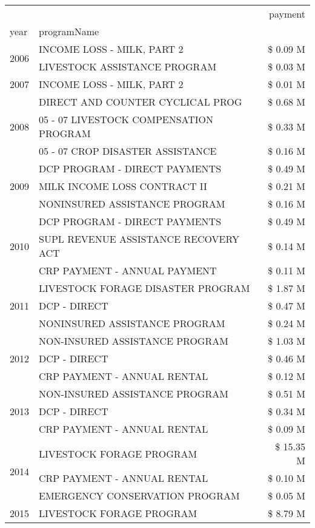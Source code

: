 \begin{tabular}{llr}
\toprule
 &  & payment \\
year & programName &  \\
\midrule
\multirow[t]{2}{*}{2006} & INCOME LOSS - MILK, PART 2 & \$ 0.09 M \\
 & LIVESTOCK ASSISTANCE PROGRAM & \$ 0.03 M \\
\cline{1-3}
2007 & INCOME LOSS - MILK, PART 2 & \$ 0.01 M \\
\cline{1-3}
\multirow[t]{3}{*}{2008} & DIRECT AND COUNTER CYCLICAL PROG & \$ 0.68 M \\
 & 05 - 07 LIVESTOCK COMPENSATION PROGRAM & \$ 0.33 M \\
 & 05 - 07 CROP DISASTER ASSISTANCE & \$ 0.16 M \\
\cline{1-3}
\multirow[t]{3}{*}{2009} & DCP PROGRAM - DIRECT PAYMENTS & \$ 0.49 M \\
 & MILK INCOME LOSS CONTRACT II & \$ 0.21 M \\
 & NONINSURED ASSISTANCE PROGRAM & \$ 0.16 M \\
\cline{1-3}
\multirow[t]{3}{*}{2010} & DCP PROGRAM - DIRECT PAYMENTS & \$ 0.49 M \\
 & SUPL REVENUE ASSISTANCE RECOVERY ACT & \$ 0.14 M \\
 & CRP PAYMENT - ANNUAL PAYMENT & \$ 0.11 M \\
\cline{1-3}
\multirow[t]{3}{*}{2011} & LIVESTOCK FORAGE DISASTER PROGRAM & \$ 1.87 M \\
 & DCP - DIRECT & \$ 0.47 M \\
 & NONINSURED ASSISTANCE PROGRAM & \$ 0.24 M \\
\cline{1-3}
\multirow[t]{3}{*}{2012} & NON-INSURED ASSISTANCE PROGRAM & \$ 1.03 M \\
 & DCP - DIRECT & \$ 0.46 M \\
 & CRP PAYMENT - ANNUAL RENTAL & \$ 0.12 M \\
\cline{1-3}
\multirow[t]{3}{*}{2013} & NON-INSURED ASSISTANCE PROGRAM & \$ 0.51 M \\
 & DCP - DIRECT & \$ 0.34 M \\
 & CRP PAYMENT - ANNUAL RENTAL & \$ 0.09 M \\
\cline{1-3}
\multirow[t]{3}{*}{2014} & LIVESTOCK FORAGE PROGRAM & \$ 15.35 M \\
 & CRP PAYMENT - ANNUAL RENTAL & \$ 0.10 M \\
 & EMERGENCY CONSERVATION PROGRAM & \$ 0.05 M \\
\cline{1-3}
\multirow[t]{3}{*}{2015} & LIVESTOCK FORAGE PROGRAM & \$ 8.79 M \\

\end{tabular}
